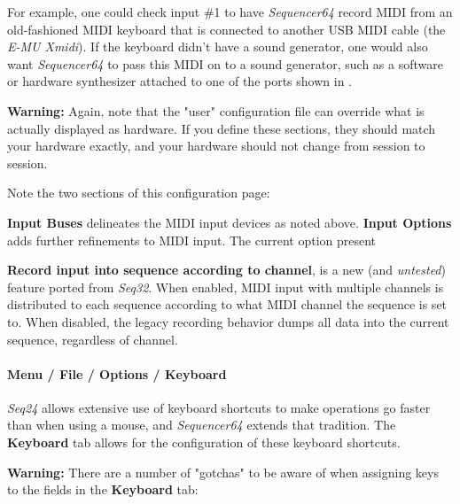    For example, one could check input \#1 to have \textsl{Sequencer64} record
   MIDI from an old-fashioned MIDI keyboard that is connected to another
   USB MIDI cable (the \textsl{E-MU Xmidi}).  If the keyboard didn't have a
   sound generator, one would also want \textsl{Sequencer64} to pass this MIDI
   on to a sound generator, such as a software or hardware synthesizer attached
   to one of the ports shown in
   .

   \textbf{Warning:}
   Again, note that the "user" configuration file can override what is actually
   displayed as hardware.  If you define these sections, they should match your
   hardware exactly, and your hardware should not change from session to
   session.

   Note the two sections of this configuration page:

   \textbf{Input Buses} delineates the MIDI input devices as noted above.
   \textbf{Input Options} adds further refinements to MIDI input.  The current 
   option present

   \textbf{Record input into sequence according to channel},
   is a new (and \textsl{untested}) feature ported from \textsl{Seq32}.
   When enabled, MIDI input with multiple channels is distributed to
   each sequence according to what MIDI channel the sequence is set to.
   When disabled, the legacy recording behavior dumps all data into the current
   sequence, regardless of channel.

\paragraph{Menu / File / Options / Keyboard }
\label{paragraph:seq64_menu_file_options_keyboard}

   \textsl{Seq24} allows extensive use of
   keyboard shortcuts to make operations go faster than when using a mouse,
   and \textsl{Sequencer64} extends that tradition.
   The \textbf{Keyboard} tab allows for the configuration of these keyboard
   shortcuts.

   \textbf{Warning:}
   There are a number of "gotchas" to be aware of when assigning keys to the
   fields in the \textbf{Keyboard} tab:

